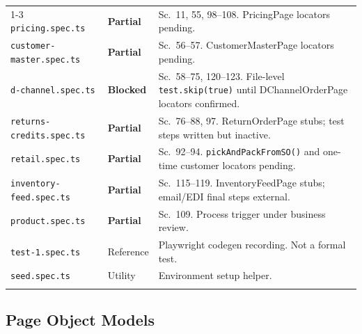 \documentclass[a4paper,11pt]{article}
\begin{document}
\begin{longtable}{p{} p{} p{}}
\cmidrule{1-3}
\texttt{pricing.spec.ts} & \textcolor{statusYellow}{\textbf{Partial}} & Sc.\ 11, 55, 98--108. PricingPage locators pending. \\\relax
\cmidrule{1-3}
\texttt{customer-master.spec.ts} & \textcolor{statusYellow}{\textbf{Partial}} & Sc.\ 56--57. CustomerMasterPage locators pending. \\\relax
\cmidrule{1-3}
\texttt{d-channel.spec.ts} & \textcolor{statusRed}{\textbf{Blocked}} & Sc.\ 58--75, 120--123. File-level \texttt{test.skip(true)} until DChannelOrderPage locators confirmed. \\\relax
\cmidrule{1-3}
\texttt{returns-credits.spec.ts} & \textcolor{statusYellow}{\textbf{Partial}} & Sc.\ 76--88, 97. ReturnOrderPage stubs; test steps written but inactive. \\\relax
\cmidrule{1-3}
\texttt{retail.spec.ts} & \textcolor{statusYellow}{\textbf{Partial}} & Sc.\ 92--94. \texttt{pickAndPackFromSO()} and one-time customer locators pending. \\\relax
\cmidrule{1-3}
\texttt{inventory-feed.spec.ts} & \textcolor{statusYellow}{\textbf{Partial}} & Sc.\ 115--119. InventoryFeedPage stubs; email/EDI final steps external. \\\relax
\cmidrule{1-3}
\texttt{product.spec.ts} & \textcolor{statusYellow}{\textbf{Partial}} & Sc.\ 109. Process trigger under business review. \\\relax
\cmidrule{1-3}
\texttt{test-1.spec.ts} & \textcolor{statusGray}{Reference} & Playwright codegen recording. Not a formal test. \\\relax
\cmidrule{1-3}
\texttt{seed.spec.ts} & \textcolor{statusGray}{Utility} & Environment setup helper. \\\relax
\cmidrule{1-3}
\bottomrule
\end{longtable}

\subsection{Page Object Models}
\end{document}
